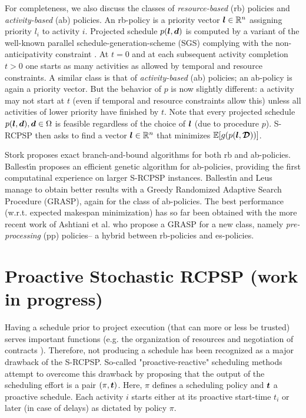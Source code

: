 	For completeness, we also discuss the classes of 
	\emph{resource-based} (rb) policies and \emph{activity-based} (ab) policies.
	An rb-policy is a priority vector $\boldsymbol{l} \in \mathbb{R}^n$ assigning
	priority $l_i$ to activity $i$.
	Projected schedule $p(\boldsymbol{l}, \boldsymbol{d})$ is computed by a variant of the
	well-known parallel schedule-generation-scheme (SGS)
	complying with the non-anticipativity constraint  \cite{ballestin2009resource}.
	At $t=0$ and at each subsequent activity completion $t > 0$
	one starts as many activities as allowed by temporal and resource constraints.
	A similar class is that of \emph{activity-based} (ab) policies;
	an ab-policy is again a priority vector.
	But the behavior of $p$ is now slightly different:
	a activity may not start at $t$ 
	(even if temporal and resource constraints allow this) unless 
	all activities of lower priority have finished by $t$.
	Note that every projected schedule $p(\boldsymbol{l},\boldsymbol{d}), \boldsymbol{d} \in \Omega$
	is feasible regardless of the choice of $\boldsymbol{l}$ (due to procedure $p$).
	S-RCPSP then asks to find a vector 
	$\boldsymbol{l} \in \mathbb{R}^n$ that minimizes $\mathbb{E}[g(p(\boldsymbol{l},\boldsymbol{\mathcal{D}}))]$.
	
	Stork \cite{stork2000branch} proposes exact branch-and-bound algorithms for both rb and ab-policies.
	Ballest{\'\i}n \cite{ballestin2007worthwhile} proposes
	an efficient genetic algorithm for ab-policies,
 	providing the first computatinal experience on larger S-RCPSP instances.
	Ballest{\'\i}n and Leus \cite{ballestin2009resource} manage 
	to obtain better results with a 
	Greedy Randomized Adaptive Search Procedure (GRASP), 
	again for the class of ab-policies.
	The best performance (w.r.t. expected makespan minimization)
	has so far been obtained with the more recent work of
	Ashtiani et al. \cite{ashtiani2011new} who propose a GRASP
	for a new class, namely \emph{pre-processing} (pp) policies--%
	a hybrid between rb-policies and es-policies.
	
	\section{Proactive Stochastic RCPSP (work in progress)}
	\label{sec-probdef}
	
	Having a schedule prior to project execution (that can more or less be trusted) serves important functions 
	(e.g. the organization of resources and negotiation of contracts 
	\cite{herroelen2004robust,braeckmans2005proactive}).
	Therefore, not producing a schedule has been recognized as a major drawback of the S-RCPSP.
	So-called "proactive-reactive" scheduling methods
	\cite{herroelen2004robust,leus2004stability,van2008,deblaere2011proactive,lamas2014purely}
	attempt to overcome this drawback by proposing that
	the output of the scheduling effort is a pair $(\pi, \boldsymbol{t})$.
	Here, $\pi$ defines a scheduling policy and $\boldsymbol{t}$ a proactive schedule.
 	Each activity $i$ starts either at its proactive start-time $t_i$ or later (in case of delays)
 	as dictated by policy $\pi$.
	
